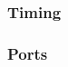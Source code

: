 \documentclass[a4paper,11pt]{article}%
\begin{document}
\subsubsection{Timing}
\subsubsection{Ports}

\pagebreak



\end{document}
